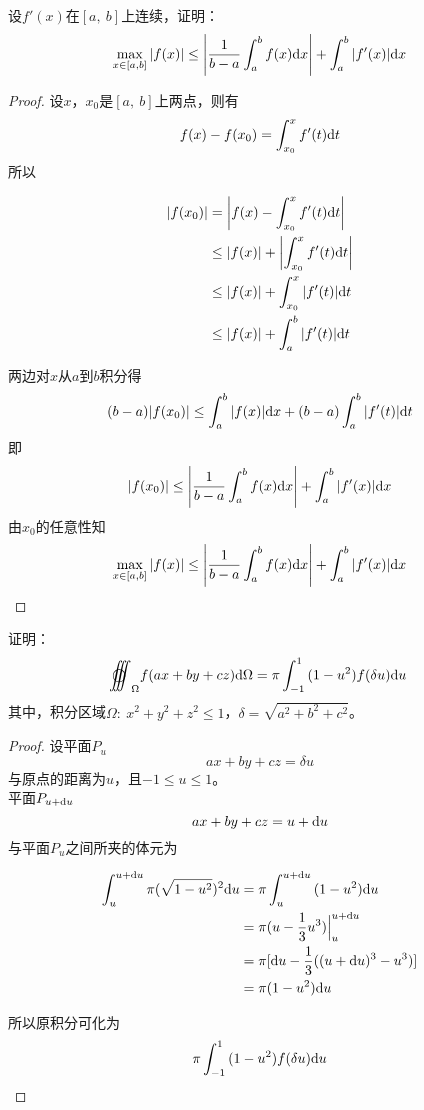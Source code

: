 \begin{proposition}
    
    设$f'(x)$在$[a,\ b]$上连续，证明：
    $$\max_{x\in[a,b]}{|f(x)|} \leq \left|\dfrac{1}{b - a}\int_{a}^{b}{f(x)}\mathrm{d} x\right| + \int_{a}^{b}{|f'(x)|}\mathrm{d} x$$

\end{proposition}

\begin{proof}

    设$x$，$x_0$是$[a,\ b]$上两点，则有
    $$f(x) - f(x_0) = \int_{x_0}^{x}{f'(t)}\mathrm{d} t$$
    所以

    \begin{align*}
        |f(x_0)| & = \left|f(x) - \int_{x_0}^{x}{f'(t)}\mathrm{d} t \right| \\
        & \leq |f(x)| + \left|\int_{x_0}^{x}{f'(t)}\mathrm{d} t \right| \\
        & \leq |f(x)| +  \int_{x_0}^{x}{|f'(t)|}\mathrm{d} t \\
        & \leq |f(x)| +  \int_{a}^{b}{|f'(t)|}\mathrm{d} t \\
    \end{align*}

    两边对$x$从$a$到$b$积分得
    $$(b - a)|f(x_0)| \leq \int_{a}^{b}{|f(x)|}\mathrm{d} x + (b - a)\int_{a}^{b}{|f'(t)|}\mathrm{d} t$$
    即
    $$|f(x_0)| \leq \left|\dfrac{1}{b - a}\int_{a}^{b}{f(x)}\mathrm{d} x\right| + \int_{a}^{b}{|f'(x)|}\mathrm{d} x$$
    由$x_0$的任意性知
    $$\max_{x\in[a,b]}{|f(x)|} \leq \left|\dfrac{1}{b - a}\int_{a}^{b}{f(x)}\mathrm{d} x\right| + \int_{a}^{b}{|f'(x)|}\mathrm{d} x$$
    
\end{proof}

\begin{theorem}

    证明：
    $$\oooint_{\Omega}{f(ax + by + cz)}\diff \Omega = \pi \int_{-1}^{1}{(1 - u^2)f(\delta u)}\diff u$$
    其中，积分区域$\Omega:\ x^2 + y^2 + z^2 \leq 1$，$\delta = \sqrt{a^2 + b^2 + c^2}$。

\end{theorem}

\begin{proof}

    设平面$P_u$
    $$ax + by + cz = \delta u$$
    与原点的距离为$u$，且$-1 \leq u \leq 1$。\\
    平面$P_{u + \mathrm{d} u}$
    $$ax + by + cz = u + \mathrm{d} u$$
    与平面$P_u$之间所夹的体元为
    
    \begin{align*}
        \int_{u}^{u + \mathrm{d} u}{\pi (\sqrt{1 - u^2})^2}\mathrm{d} u & = \pi \int_{u}^{u + \mathrm{d} u}{(1 - u^2)}\mathrm{d} u \\
        & = \pi (u - \dfrac{1}{3}u^3) \Big|_{u}^{u + \mathrm{d} u} \\
        & = \pi [\mathrm{d} u - \dfrac{1}{3}((u + \mathrm{d} u)^3 - u^3)] \\
        & = \pi (1 - u^2)\mathrm{d} u
    \end{align*}

    所以原积分可化为
    $$\pi \int_{-1}^{1}{(1 - u^2)f(\delta u)}\mathrm{d} u$$

\end{proof}

